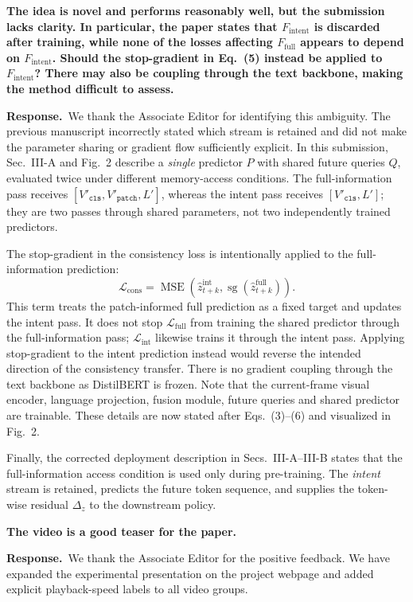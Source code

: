 \documentclass[11pt,a4paper]{article}
\newcommand{\C}[1]{\textbf{#1}\par\vspace{2pt}}
\newcommand{\R}[1]{\textbf{Response.}~#1}
\begin{document}
\begin{qa}

\item \C{The idea is novel and performs reasonably well, but the submission lacks clarity.
In particular, the paper states that $F_{\mathrm{intent}}$ is discarded after training, while
none of the losses affecting $F_{\mathrm{full}}$ appears to depend on $F_{\mathrm{intent}}$.
Should the stop-gradient in Eq.~(5) instead be applied to $F_{\mathrm{intent}}$? There may also
be coupling through the text backbone, making the method difficult to assess.}
\R{We thank the Associate Editor for identifying this ambiguity. The previous manuscript incorrectly stated which stream is retained and did not make the parameter sharing or gradient flow sufficiently explicit. In this submission, Sec.~III-A and Fig.~2 describe a \emph{single}
predictor $P$ with shared future queries $Q$, evaluated twice under different memory-access
conditions. The full-information pass receives
$[V'_{\texttt{cls}},V'_{\texttt{patch}},L']$, whereas the intent pass receives
$[V'_{\texttt{cls}},L']$; they are two passes through shared parameters, not two independently
trained predictors.

The stop-gradient in the consistency loss is intentionally applied to the full-information
prediction:
\[
\mathcal{L}_{\mathrm{cons}}=
\operatorname{MSE}\!\left(\hat z^{\mathrm{int}}_{t+k},
\operatorname{sg}\!\left(\hat z^{\mathrm{full}}_{t+k}\right)\right).
\]
This term treats the patch-informed full prediction as a fixed target and updates the intent pass.
It does not stop $\mathcal{L}_{\mathrm{full}}$ from training the shared predictor through the
full-information pass; $\mathcal{L}_{\mathrm{int}}$ likewise trains it through the intent pass.
Applying stop-gradient to the intent prediction instead would reverse the intended direction of
the consistency transfer. There is no gradient coupling through the text backbone as DistilBERT is frozen. Note that the current-frame visual encoder, language projection, fusion module, future queries and shared predictor are trainable. These details are now stated after Eqs.~(3)--(6) and visualized in Fig.~2.

Finally, the corrected deployment description in Secs.~III-A--III-B states that the
full-information access condition is used only during pre-training. The \emph{intent} stream is
retained, predicts the future token sequence, and supplies the token-wise residual $\Delta_z$ to
the downstream policy.}

\item \C{The video is a good teaser for the paper.}
\R{We thank the Associate Editor for the positive feedback. We have expanded the experimental
presentation on the project webpage and added explicit playback-speed labels to all video groups.}

\end{qa}
\end{document}
